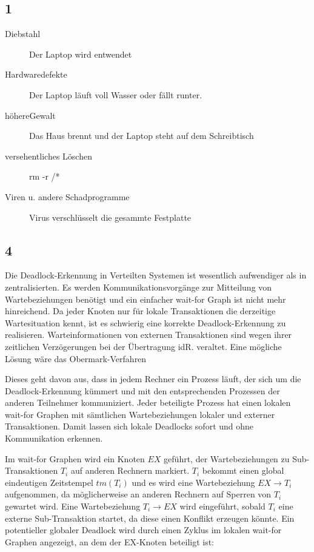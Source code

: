 \documentclass[ngerman]{fbi-aufgabenblatt}
\begin{document}
\setcounter{section}{0}
   


\subsection*{1}
\begin{description}
	\item[Diebstahl] Der Laptop wird entwendet
	\item [Hardwaredefekte] Der Laptop läuft voll Wasser oder fällt runter.
	\item [höhereGewalt] Das Haus brennt und der Laptop steht auf dem Schreibtisch
	\item [versehentliches Löschen] rm -r /*
	\item[Viren u. andere Schadprogramme] Virus verschlüsselt die gesammte Festplatte
\end{description} 
\subsection*{4}
Die Deadlock-Erkennung in Verteilten Systemen ist wesentlich aufwendiger als in zentralisierten. Es werden Kommunikationsvorgänge zur Mitteilung von Wartebeziehungen benötigt und ein einfacher wait-for Graph ist nicht mehr hinreichend.
 Da jeder Knoten nur für lokale Transaktionen die derzeitige Wartesituation kennt, ist es schwierig eine korrekte Deadlock-Erkennung zu realisieren. Warteinformationen von externen Transaktionen sind wegen ihrer zeitlichen Verzögerungen bei der Übertragung idR. veraltet. 
Eine mögliche Lösung wäre das Obermark-Verfahren

Dieses geht davon aus, dass in jedem Rechner ein Prozess läuft, der sich um die Deadlock-Erkennung kümmert und mit den entsprechenden Prozessen der anderen Teilnehmer kommuniziert. Jeder beteiligte Prozess hat einen lokalen wait-for Graphen mit sämtlichen Wartebeziehungen lokaler und externer Transaktionen. Damit lassen sich lokale Deadlocks sofort und ohne Kommunikation erkennen. 

Im wait-for Graphen wird ein Knoten $EX$ geführt, der Wartebeziehungen zu Sub-Transaktionen $T_{i}$ auf anderen Rechnern markiert. $T_{i}$ bekommt einen global eindeutigen Zeitstempel $tm(T_{i})$ und es wird 
eine Wartebeziehung $EX \rightarrow T_{i}$ aufgenommen, da möglicherweise an anderen Rechnern auf Sperren von $T_{i}$ gewartet wird. Eine Wartebeziehung $T_{i} \rightarrow EX$ wird eingeführt, sobald $T_{i}$ eine externe Sub-Transaktion startet, da diese einen Konflikt erzeugen könnte. Ein potentieller globaler Deadlock wird durch einen Zyklus im lokalen wait-for Graphen angezeigt, an dem der EX-Knoten beteiligt ist:
\end{document}
